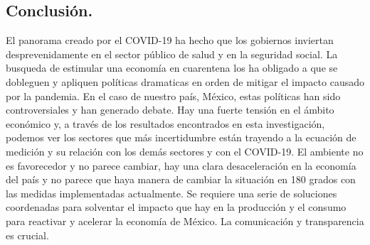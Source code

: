\documentclass[a4paper]{article}
\begin{document}
\subsection{Conclusión.}

El panorama creado por el COVID-19 ha hecho que los gobiernos inviertan desprevenidamente en el sector público de salud y en la seguridad social. La busqueda de estimular una economía en cuarentena los ha obligado a que se dobleguen y apliquen políticas dramaticas en orden de mitigar el impacto causado por la pandemia. 
\newline
\newline
En el caso de nuestro país, México, estas políticas han sido controversiales y han generado debate. Hay una fuerte tensión en el ámbito económico y, a través de los resultados encontrados en esta investigación, podemos ver los sectores que más incertidumbre están trayendo a la ecuación de medición y su relación con los demás sectores y con el COVID-19.
\newline
\newline
El ambiente no es favorecedor y no parece cambiar, hay una clara desaceleración en la economía del país y no parece que haya manera de cambiar la situación en 180 grados con las medidas implementadas actualmente.
\newline
\newline
Se requiere una serie de soluciones coordenadas para solventar el impacto que hay en la producción y el consumo para reactivar y acelerar la economía de México. La comunicación y transparencia es crucial.
\end{document}
